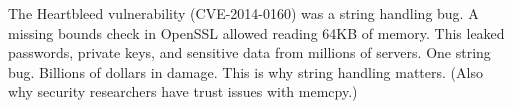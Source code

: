 \begin{tipbox}
The Heartbleed vulnerability (CVE-2014-0160) was a string handling bug. A missing bounds check in OpenSSL allowed reading 64KB of memory. This leaked passwords, private keys, and sensitive data from millions of servers. One string bug. Billions of dollars in damage. This is why string handling matters. (Also why security researchers have trust issues with memcpy.)
\end{tipbox}
